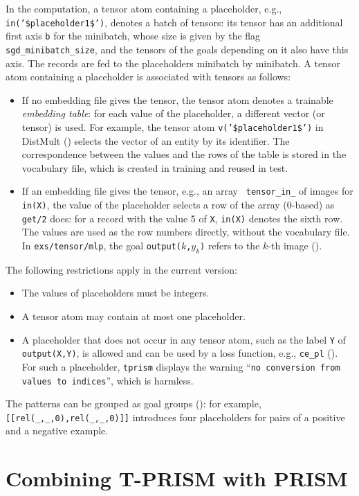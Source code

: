 \documentclass[a4paper]{report}
\begin{document}
In the computation, a tensor atom containing a placeholder, e.g., {\tt
	in('\$placeholder1\$')}, denotes a batch of tensors: its tensor has an
additional first axis {\tt b} for the minibatch, whose size is given by the
flag {\tt sgd\_minibatch\_size}, and the tensors of the goals depending on it
also have this axis.  The records are fed to the placeholders minibatch by
minibatch.  A tensor atom containing a placeholder is associated with
tensors as follows:
\begin{itemize}
	\item If no embedding file gives the tensor, the tensor atom denotes a
	trainable {\em embedding table}: for each value of the placeholder, a
	different vector (or tensor) is used.  For example, the tensor atom
	{\tt v('\$placeholder1\$')} in DistMult ()
	selects the vector of an entity by its identifier.  The correspondence
	between the values and the rows of the table is stored in the
	vocabulary file, which is created in training and reused in test.
	\item If an embedding file gives the tensor, e.g., an array {\tt
		tensor\_in\_} of images for {\tt in(X)}, the value of the placeholder
	selects a row of the array (0-based) as {\tt get/2} does: for a record
	with the value 5 of {\tt X}, {\tt in(X)} denotes the sixth row.  The
	values are used as the row numbers directly, without the vocabulary file.
	In {\tt exs/tensor/mlp}, the goal {\tt output($k$,$y_k$)} refers to the
	$k$-th image ().
\end{itemize}
The following restrictions apply in the current version:
\begin{itemize}
	\item The values of placeholders must be integers.
	\item A tensor atom may contain at most one placeholder.
	\item A placeholder that does not occur in any tensor atom, such as the
	label {\tt Y} of {\tt output(X,Y)}, is allowed and can be used by a loss
	function, e.g., {\tt ce\_pl} ().  For such a placeholder,
	{\tt tprism} displays the warning ``{\tt no conversion from values to indices}'', which is harmless.
\end{itemize}
The patterns can be grouped as goal groups ():
for example, {\tt [[rel(\_,\_,0),rel(\_,\_,0)]]} introduces four
placeholders for pairs of a positive and a negative example.

\section{Combining T-PRISM with PRISM}
\label{sec:with_prism}
\end{document}
